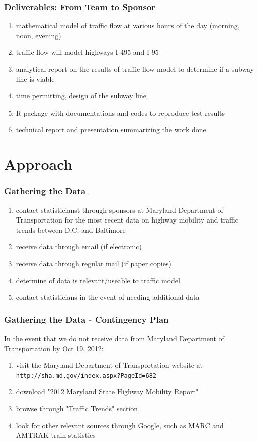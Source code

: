 \documentclass[compress,handout,10pt]{beamer}
\let\olditem\item
\renewcommand{\item}{\setlength{\itemsep}{0.5\baselineskip}\olditem}
\begin{document}
\begin{frame}
    \frametitle{Deliverables: From Team to Sponsor}
    \begin{enumerate}
        \item mathematical model of traffic flow at various hours of the day (morning, noon, evening)
	\item traffic flow will model highways I-495 and I-95
	\item analytical report on the results of traffic flow model to determine if a subway line is viable
	\item time permitting, design of the subway line
	\item R package with documentations and codes to reproduce test results
	\item technical report and presentation summarizing the work done
    \end{enumerate}
\end{frame}

\section{Approach}
\begin{frame}
    \frametitle{Gathering the Data}
     \begin{enumerate}
	\item contact statisticianst through sponsors at Maryland Department of Transportation for the most recent data on highway mobility and traffic trends between D.C. and Baltimore
	\item receive data through email (if electronic)
	\item receive data through regular mail (if paper copies)
	\item determine of data is relevant/useable to traffic model
	\item contact statisticians in the event of needing additional data
     \end{enumerate}
\end{frame}

\begin{frame}
    \frametitle{Gathering the Data - Contingency Plan}
    In the event that we do not receive data from Maryland Department of Transportation by Oct 19, 2012:
     \begin{enumerate}
    \vspace{7pt}
	\item visit the Maryland Department of Transportation website at \texttt{http://sha.md.gov/index.aspx?PageId=682}
	\item download "2012 Maryland State Highway Mobility Report"
	\item browse through "Traffic Trends" section
	\item look for other relevant sources through Google, such as MARC and AMTRAK train statistics
     \end{enumerate}
\end{frame}
\end{document}
